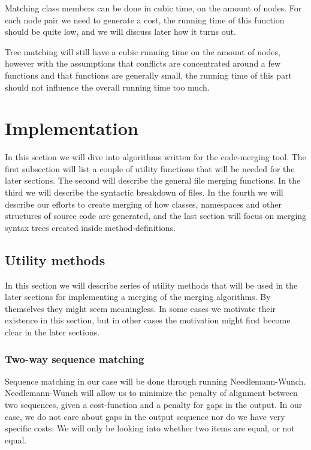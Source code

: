 \documentclass[11pt]{article}
\begin{document}
Matching class members can be done in cubic time, on the amount of nodes. For each node pair we need to generate a cost, the running time of this function should be quite low, and we will discuss later how it turns out. 

Tree matching will still have a cubic running time on the amount of nodes, however with the assumptions that conflicts are concentrated around a few functions and that functions are generally small, the running time of this part should not influence the overall running time too much.

\clearpage

\section{Implementation}
In this section we will dive into algorithms written for the code-merging tool. The first subsection will list a couple of utility functions that will be needed for the later sections. The second will describe the general file merging functions. In the third we will describe the syntactic breakdown of files. In the fourth we will describe our efforts to create merging of how classes, namespaces and other structures of source code are generated, and the last section will focus on merging syntax trees created inside method-definitions.

\subsection{Utility methods}
In this section we will describe series of utility methods that will be used in the later sections for implementing a merging of the merging algorithms. By themselves they might seem meaningless. In some cases we motivate their existence in this section, but in other cases the motivation might first become clear in the later sections.

\subsubsection{Two-way sequence matching}
Sequence matching in our case will be done through running Needlemann-Wunch. Needlemann-Wunch will allow us to minimize the penalty of alignment between two sequences, given a cost-function and a penalty for gaps in the output. In our case, we do not care about gaps in the output sequence nor do we have very specific costs: We will only be looking into whether two items are equal, or not equal.
\end{document}
